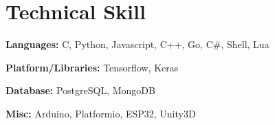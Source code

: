 \section{Technical Skill}
    \begin{onecolentry}
        \textbf{Languages:} C, Python, Javascript, C++, Go, C\#, Shell, Lua
    \end{onecolentry}

    \vspace{0.2 cm}

    \begin{onecolentry}
        \textbf{Platform/Libraries:} Tensorflow, Keras
    \end{onecolentry}

    \vspace{0.2 cm}

    \begin{onecolentry}
        \textbf{Database:} PostgreSQL, MongoDB
    \end{onecolentry}

    \vspace{0.2 cm}

    \begin{onecolentry}
        \textbf{Misc:} Arduino, Platformio, ESP32, Unity3D
    \end{onecolentry}
